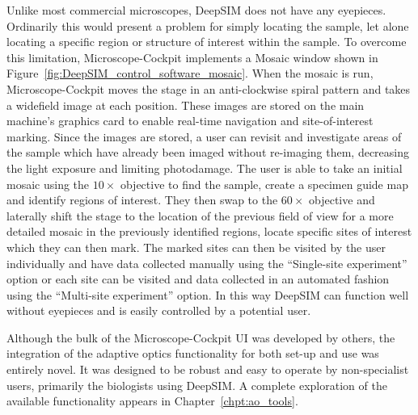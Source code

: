 Unlike most commercial microscopes, DeepSIM does not have any eyepieces. Ordinarily this would present a problem for simply locating the sample, let alone locating a specific region or structure of interest within the sample. To overcome this limitation, Microscope-Cockpit implements a Mosaic window shown in Figure~\ref{fig:DeepSIM_control_software_mosaic}. When the mosaic is run, Microscope-Cockpit moves the stage in an anti-clockwise spiral pattern and takes a widefield image at each position. These images are stored on the main machine's graphics card to enable real-time navigation and site-of-interest marking. Since the images are stored, a user can revisit and investigate areas of the sample which have already been imaged without re-imaging them, decreasing the light exposure and limiting photodamage. The user is able to take an initial mosaic using the $10\times$ objective to find the sample, create a specimen guide map and identify regions of interest. They then swap to the $60\times$ objective and laterally shift the stage to the location of the previous field of view for a more detailed mosaic in the previously identified regions, locate specific sites of interest which they can then mark. The marked sites can then be visited by the user individually and have data collected manually using the ``Single-site experiment'' option or each site can be visited and data collected in an automated fashion using the ``Multi-site experiment'' option. In this way DeepSIM can function well without eyepieces and is easily controlled by a potential user.

Although the bulk of the Microscope-Cockpit UI was developed by others, the integration of the adaptive optics functionality for both set-up and use was entirely novel. It was designed to be robust and easy to operate by non-specialist users, primarily the biologists using DeepSIM. A complete exploration of the available functionality appears in Chapter~\ref{chpt:ao_tools}.